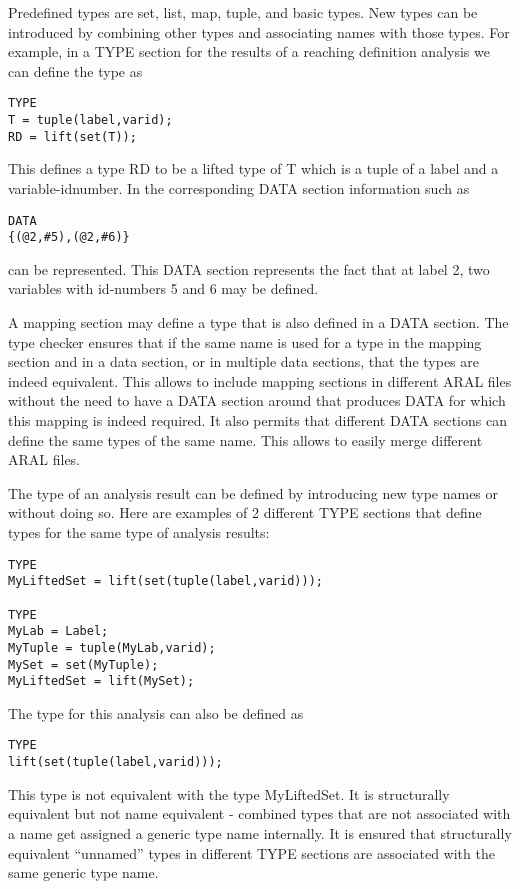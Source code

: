 Predefined types are set, list, map, tuple, and basic types. New types can be introduced by combining other types and associating names with those types.
For example, in a TYPE section for the results of a reaching definition analysis we can define the type as
\begin{verbatim}
TYPE
T = tuple(label,varid); 
RD = lift(set(T));
\end{verbatim}

This defines a type RD to be a lifted type of T which is a tuple of a label and a variable-idnumber. In the corresponding DATA section information such as 
\begin{verbatim}
DATA
{(@2,#5),(@2,#6)}
\end{verbatim}

can be represented. This DATA section represents the fact that at label 2, two variables with id-numbers 5 and 6 may be defined. 

A mapping section may define a type that is also defined in a DATA section. The type checker ensures that if the same name is used for a type in the mapping section and in a data section, or in multiple data sections, that the types are indeed equivalent. This allows to include mapping sections in different ARAL files without the need to have a DATA section around that produces DATA for which this mapping is indeed required. It also permits that different DATA sections can define the same types of the same name. This allows to easily merge different ARAL files.

The type of an analysis result can be defined by introducing new type names or without doing so. Here are examples of 2 different TYPE sections that define types for the same type of analysis results:

\begin{verbatim}
TYPE
MyLiftedSet = lift(set(tuple(label,varid)));

TYPE
MyLab = Label;
MyTuple = tuple(MyLab,varid);
MySet = set(MyTuple);
MyLiftedSet = lift(MySet);
\end{verbatim}

The type for this analysis can also be defined as 

\begin{verbatim}
TYPE
lift(set(tuple(label,varid)));
\end{verbatim}

This type is not equivalent with the type MyLiftedSet. It is structurally equivalent but not name equivalent - combined types that are not associated with a name get assigned a generic type name internally. It is ensured that structurally equivalent ``unnamed'' types in different TYPE sections are associated with the same generic type name.


